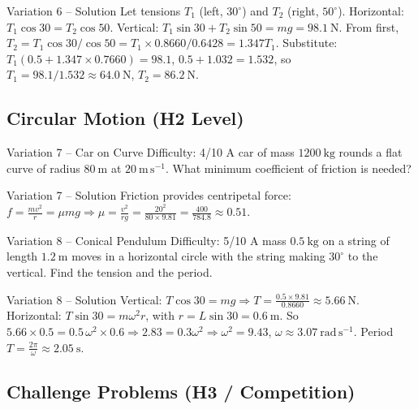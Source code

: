 \documentclass[11pt]{beamer}
\begin{document}
\begin{frame}{Variation 6 – Solution}
Let tensions $T_1$ (left, $30^\circ$) and $T_2$ (right, $50^\circ$). Horizontal: $T_1\cos30 = T_2\cos50$. Vertical: $T_1\sin30 + T_2\sin50 = mg = 98.1\ \mathrm{N}$.
From first, $T_2 = T_1\cos30/\cos50 = T_1\times0.8660/0.6428 = 1.347T_1$.
Substitute: $T_1(0.5 + 1.347\times0.7660) = 98.1$, $0.5 + 1.032 = 1.532$, so $T_1 = 98.1/1.532 \approx 64.0\ \mathrm{N}$, $T_2 = 86.2\ \mathrm{N}$.
\end{frame}

\subsection{Circular Motion (H2 Level)}

\begin{frame}[shrink=15]{Variation 7 – Car on Curve \hfill Difficulty: 4/10}
A car of mass $1200\ \mathrm{kg}$ rounds a flat curve of radius $80\ \mathrm{m}$ at $20\ \mathrm{m\,s^{-1}}$. What minimum coefficient of friction is needed?
\end{frame}

\begin{frame}{Variation 7 – Solution}
Friction provides centripetal force: $f = \frac{mv^2}{r} = \mu mg \Rightarrow \mu = \frac{v^2}{rg} = \frac{20^2}{80\times9.81} = \frac{400}{784.8} \approx 0.51$.
\end{frame}

\begin{frame}[shrink=15]{Variation 8 – Conical Pendulum \hfill Difficulty: 5/10}
A mass $0.5\ \mathrm{kg}$ on a string of length $1.2\ \mathrm{m}$ moves in a horizontal circle with the string making $30^\circ$ to the vertical. Find the tension and the period.
\end{frame}

\begin{frame}{Variation 8 – Solution}
Vertical: $T\cos30 = mg \Rightarrow T = \frac{0.5\times9.81}{0.8660} \approx 5.66\ \mathrm{N}$.
Horizontal: $T\sin30 = m\omega^2 r$, with $r = L\sin30 = 0.6\ \mathrm{m}$. So $5.66\times0.5 = 0.5\,\omega^2\times0.6 \Rightarrow 2.83 = 0.3\omega^2 \Rightarrow \omega^2 = 9.43$, $\omega \approx 3.07\ \mathrm{rad\,s^{-1}}$.
Period $T = \frac{2\pi}{\omega} \approx 2.05\ \mathrm{s}$.
\end{frame}

\subsection{Challenge Problems (H3 / Competition)}
\end{document}
